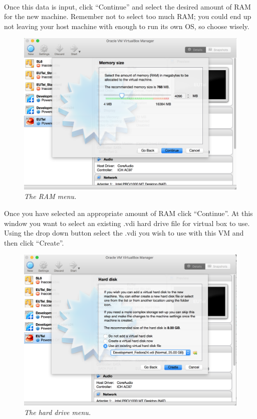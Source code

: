\documentclass[11pt]{article}
\begin{document}
\paragraph{}
Once this data is input, click ``Continue'' and select the desired amount of RAM for the new machine. Remember not to select too much RAM; you could end up not leaving your host machine with enough to run its own OS, so choose wisely.
\begin{figure}[!ht]
	\centering
	\includegraphics[scale=0.3]{choose_ram.png}
	\caption{\textit{The RAM menu.}}
\end{figure}
Once you have selected an appropriate amount of RAM click ``Continue''. At this window you want to select an existing .vdi hard drive file for virtual box to use. Using the drop down button select the .vdi you wish to use with this VM and then click ``Create''.
\begin{figure}[!ht]
	\centering
	\includegraphics[scale=0.3]{add_hdd.png}
	\caption{\textit{The hard drive menu.}}
\end{figure}
\end{document}
